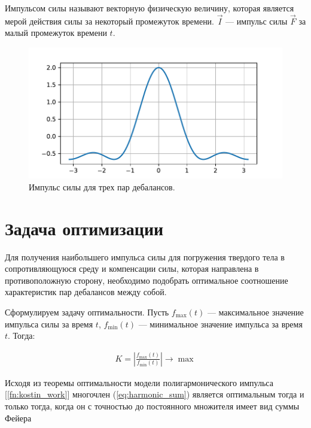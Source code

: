 \begin{definition}
    Импульсом силы называют векторную физическую величину, которая является мерой действия силы за некоторый промежуток времени. $\vec{I}$ --- импульс силы $\vec{F}$ за малый промежуток времени $t$.
\end{definition}

\begin{figure}[h]
    \centering
    \includegraphics[width=1\linewidth]{grap/impulse.pdf}
    \caption{Импульс силы для трех пар дебалансов.}
    \label{grap:impulse}
\end{figure}


\clearpage
\section{Задача оптимизации}

Для получения наибольшего импульса силы для погружения твердого тела в сопротивляющуюся среду и компенсации силы, которая направлена в противоположную сторону, необходимо подобрать оптимальное соотношение характеристик пар дебалансов между собой.

Сформулируем задачу оптимальности. Пусть $f_{\max}(t)$ --- максимальное значение импульса силы за время $t$, $f_{\min}(t)$ --- минимальное значение импульса за время $t$. Тогда:

\begin{equation}\label{eq:optim}
    \begin{aligned}
        K = \left| \frac{f_{\max}(t)}{f_{\min}(t)} \right| \rightarrow \max
    \end{aligned}
\end{equation}

Исходя из теоремы оптимальности модели полигармонического импульса [\ref{fn:kostin_work}] многочлен (\ref{eq:harmonic_sum}) является оптимальным тогда и только тогда, когда он с точностью до постоянного множителя имеет вид суммы Фейера

